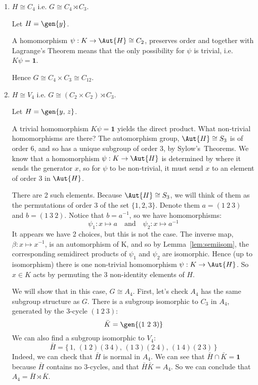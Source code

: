 \begin{enumerate}
    \item \(H \cong C_4\) i.e. \(G \cong C_4 \rtimes C_3\).

        Let \(H = \gen{y}\).

        A homomorphism \(\psi:K \to \Aut{H} \cong C_2\), preserves order and together with Lagrange's Theorem means that
        the only possibility for \(\psi\) is trivial, i.e. \(K\psi = \bm{1}\).

        Hence \(G \cong C_4 \times C_3 \cong C_{12}\).

    \item \(H \cong V_4\) i.e. \(G \cong (C_2 \times C_2) \rtimes C_3\).

        Let \(H = \gen{y,\,z}\).

        A trivial homomorphism \(K\psi = \bm{1}\) yields the direct product.
        What non-trivial homomorphisms are there?
        The automorphism group, \(\Aut{H} \cong S_3\) is of order 6, and so has a unique subgroup of order 3, by
        Sylow's~Theorems.
        We know that a homomorphism \(\psi: K \to \Aut{H}\) is determined by where it sends the generator
        \(x\), so for \(\psi\) to be non-trivial, it must send \(x\) to an element of order 3 in \(\Aut{H}\).

        There are 2 such elements.
        Because \(\Aut{H} \cong S_3\), we will think of them as the permutations of order 3 of the set \(\{1, 2, 3\}\).
        Denote them \(a = (1\ 2\ 3)\) and \(b = (1\ 3\ 2)\).
        Notice that \(b = a^{-1}\), so we have homomorphisms:
        \[\psi_1:x \mapsto a \quad \text{and} \quad \psi_2:x \mapsto a^{-1}\]
        It appears we have 2 choices, but this is not the case.
        The inverse map, \(\beta:x \mapsto x^{-1}\), is an automorphism of K, and so by Lemma~\ref{lem:semiisom}, the
        corresponding semidirect products of \(\psi_1\) and \(\psi_2\) are isomorphic.
        Hence (up to isomorphism) there is one non-trivial homomorphism \(\psi:K \to \Aut{H}\).
        So \(x \in K\) acts by permuting the 3 non-identity elements of \(H\).

        We will show that in this case, \(G \cong A_4\).
        First, let's check \(A_4\) has the same subgroup structure as \(G\).
        There is a subgroup isomorphic to \(C_3\) in \(A_4\), generated by the 3-cycle \((1\ 2\ 3)\):
        \[\bar{K} = \gen{(1\ 2\ 3)}\]
        We can also find a subgroup isomorphic to \(V_4\):
        \[\bar{H} = \{\,1,\, (1\ 2)(3\ 4),\, (1\ 3)(2\ 4),\, (1\ 4)(2\ 3)\,\}\]
        Indeed, we can check that \(\bar{H}\) is normal in \(A_4\).
        We can see that \(\bar{H} \cap \bar{K} = \bm{1}\) because \(\bar{H}\) contains no 3-cycles, and that
        \(\bar{H}\bar{K} = A_4\).
        So we can conclude that \(A_4 = \bar{H} \rtimes \bar{K}\).


\end{enumerate}
